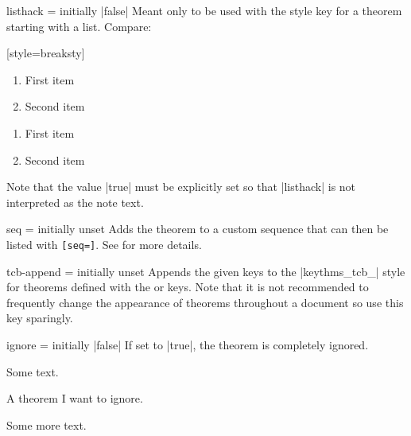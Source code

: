 \documentclass{ltxdoc}
\newcommand{\bracks}[1]{\texttt{[#1]}}
\begin{document}
\begin{docKey}{listhack}
  {=\textbar{}}
  {initially |false|}
Meant only to be used with the  style key for a theorem starting with a list.
Compare:

\begin{codepreamble}
[style=breaksty]
\end{codepreamble}

\begin{keythmscode}[withpreamble]
\begin{observation}
\begin{enumerate}
\item First item
\item Second item
\end{enumerate}
\end{observation}

\begin{observation}[listhack=true]
\begin{enumerate}
\item First item
\item Second item
\end{enumerate}
\end{observation}
\end{keythmscode}

Note that the value |true| must be explicitly set so that |listhack| is not interpreted as the note text.
\end{docKey}

\begin{docKey}[][doc label=thmuse/seq]{seq}
  {=}
  {initially unset}
Adds the theorem to a custom sequence  that can then be listed with \bracks{seq=}.
See  for more details.
\end{docKey}

\begin{docKey}{tcb-append}
  {=}
  {initially unset}
Appends the given  keys to the |keythms_tcb_| style for theorems defined with the  or  keys.
Note that it is not recommended to frequently change the appearance of theorems throughout a document so use this key sparingly.
\end{docKey}

\begin{docKey}[][doc label=thmuse/ignore]{ignore}
  {=\textbar{}}
  {initially |false|}
If set to |true|, the theorem is completely ignored.

\begin{keythmscode}
Some text.
\begin{theorem}[ignore=true]
A theorem I want to ignore.
\end{theorem}
Some more text.
\end{keythmscode}

\end{docKey}
\end{document}
